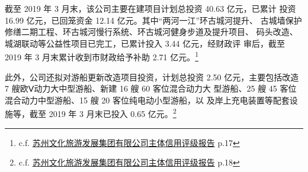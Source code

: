 \documentclass[H:\workspace\担保人财务信息2\杭州大运河\HangZhouText.tex]{subfiles}
\begin{document}
截至 2019 年 3 月末，该公司主要在建项目计划总投资 40.63 亿元，已累计
投资 16.99 亿元，已回笼资金 12.14 亿元。其中“两河一江”环古城河提升、
古城墙保护修缮二期工程、环古城河慢行系统、环古城河健身步道及提升项目、
码头改造、城湖联动等公益性项目已完工，已累计投入 3.44 亿元，经财政评
审后，截至 2019 年 3 月末累计收到市财政给予补助 2.71 亿元。\footnote{c.f. 
\href{http://file.finance.sina.com.cn/211.154.219.97:9494/MRGG/BOND/2020/2020-7/2020-07-13/14855437.PDF}{苏州文化旅游发展集团有限公司主体信用评级报告} p.17}\par 
此外，公司还拟对游船更新改造项目投资，计划总投资 2.50
亿元，主要包括改造 7 艘欧Ⅴ动力大中型游船、新建 16 艘 60 客位混合动力大
型游船、25 艘 45 客位混合动力中型游船、15 艘 20 客位纯电动小型游船，以
及岸上充电装置等配套设施等，截至 2019 年 3 月末已投入 0.65 亿元。\footnote{c.f. \href{http://file.finance.sina.com.cn/211.154.219.97:9494/MRGG/BOND/2020/2020-7/2020-07-13/14855437.PDF}{苏州文化旅游发展集团有限公司主体信用评级报告} p.18}
\end{document}
